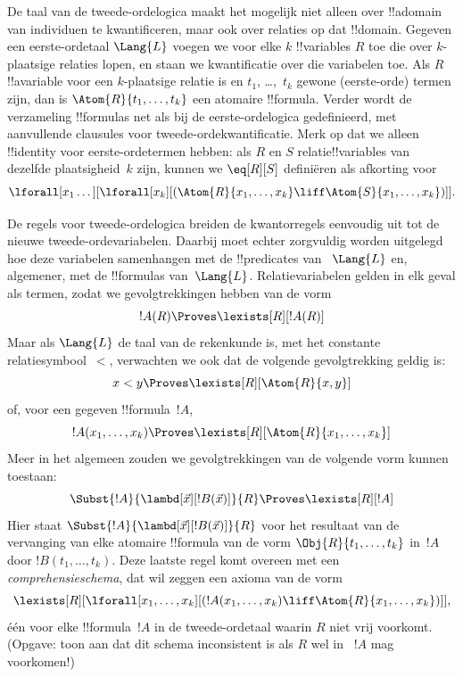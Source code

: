 \documentclass[../../../include/open-logic-section]{subfiles}
\begin{document}


De taal van de tweede-ordelogica maakt het mogelijk niet alleen over
!!a{domain} van individuen te kwantificeren, maar ook over relaties op dat
!!{domain}. Gegeven een eerste-ordetaal $\Lang{L}$ voegen we voor elke $k$
!!{variable}s $R$ toe die over $k$-plaatsige relaties lopen, en staan we
kwantificatie over die variabelen toe. Als $R$ !!a{variable} voor een
$k$-plaatsige relatie is en $t_1$, \dots,~$t_k$ gewone (eerste-orde) termen
zijn, dan is $\Atom{R}{t_1,\dots,t_k}$ een atomaire !!{formula}. Verder wordt
de verzameling !!{formula}s net als bij de eerste-ordelogica gedefinieerd,
met aanvullende clausules voor tweede-ordekwantificatie. Merk op dat we alleen
!!{identity} voor eerste-ordetermen hebben: als $R$ en $S$ relatie!!{variable}s
van dezelfde plaatsigheid~$k$ zijn, kunnen we $\eq[R][S]$ definiëren als
afkorting voor
\[
\lforall[x_1 \dots][\lforall[x_k][(\Atom{R}{x_1, \dots, x_k} \liff
  \Atom{S}{x_1, \dots, x_k})]].
\]

De regels voor tweede-ordelogica breiden de kwantorregels eenvoudig uit tot
de nieuwe tweede-ordevariabelen. Daarbij moet echter zorgvuldig worden
uitgelegd hoe deze variabelen samenhangen met de !!{predicate}s van
~$\Lang{L}$ en, algemener, met de !!{formula}s van~$\Lang{L}$. Relatievariabelen
gelden in elk geval als termen, zodat we gevolgtrekkingen hebben van de vorm
\[
!A(R) \Proves \lexists[R][!A(R)]
\]
Maar als $\Lang{L}$ de taal van de rekenkunde is, met het constante
relatiesymbool~$<$, verwachten we ook dat de volgende gevolgtrekking geldig is:
\[
x < y \Proves \lexists[R][\Atom{R}{x,y}]
\]
of, voor een gegeven !!{formula}~$!A$,
\[
!A(x_1, \dots, x_k) \Proves \lexists[R][\Atom{R}{x_1,\dots,x_k}]
\]
Meer in het algemeen zouden we gevolgtrekkingen van de volgende vorm kunnen
toestaan:
\[
\Subst{!A}{\lambd[\vec x][!B(\vec x)]}{R} \Proves
\lexists[R][!A]
\]
Hier staat $\Subst{!A}{\lambd[\vec x][!B(\vec x)]}{R}$ voor het resultaat
van de vervanging van elke atomaire !!{formula} van de vorm
$\Obj{R}{t_1,\dots,t_k}$ in~$!A$ door $!B(t_1, \dots, t_k)$. Deze laatste
regel komt overeen met een {\em comprehensieschema}, dat wil zeggen een
axioma van de vorm
\[
\lexists[R][\lforall[x_1, \dots, x_k][(!A(x_1, \dots, x_k) \liff
\Atom{R}{x_1, \dots, x_k})]],
\]
één voor elke !!{formula}~$!A$ in de tweede-ordetaal waarin $R$ niet vrij
voorkomt. (Opgave: toon aan dat dit schema inconsistent is als $R$ wel in
~$!A$ mag voorkomen!)
\end{document}

